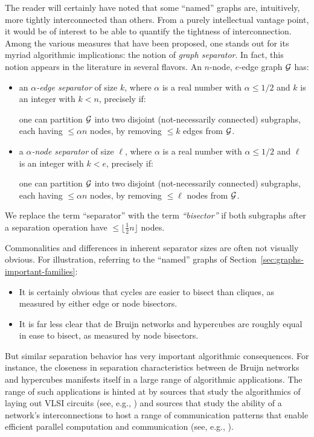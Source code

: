 The reader will certainly have noted that some ``named'' graphs are,
intuitively, more tightly interconnected than others.  From a purely
intellectual vantage point, it would be of interest to be able to
quantify the tightness of interconnection.  Among the various measures
that have been proposed, one stands out for its myriad algorithmic
implications: the notion of {\it graph separator}.  In fact, this
notion appears in the literature in several flavors.  An $n$-node,
$e$-edge graph $\mbox{$\cal G$}$ has:
\begin{itemize}
\item
an {\it $\alpha$-edge separator} of size $k$, 
 where $\alpha$ is a
real number with $\alpha \leq 1/2$ and $k$ is an integer with $k < n$,
precisely if:

\smallskip

one can partition $\mbox{$\cal G$}$ into two disjoint (not-necessarily connected)
subgraphs, each having $\leq \alpha n$ nodes, by removing $\leq k$
edges from $\mbox{$\cal G$}$.

\item
a {\it $\alpha$-node separator} of size $\ell$,
where $\alpha$ is a real number with $\alpha \leq 1/2$ and $\ell$ is
an integer with $k < e$, precisely if:

\smallskip

one can partition $\mbox{$\cal G$}$ into two disjoint (not-necessarily connected)
subgraphs, each having $\leq \alpha n$ nodes, by removing $\leq \ell$
nodes from $\mbox{$\cal G$}$.
\end{itemize}
We replace the term ``separator'' with the term {\em ``bisector''} 
 
if both subgraphs after a separation operation have $\leq \lfloor
\frac{1}{2} n \rfloor$ nodes.

\medskip

Commonalities and differences in inherent separator sizes are often
not visually obvious.  For illustration, referring to the ``named''
graphs of Section~\ref{sec:graphs-important-families}:
\begin{itemize}
\item
It is certainly obvious that cycles are easier to bisect than cliques,
as measured by either edge or node bisectors.
\item
It is far less clear that de Bruijn networks and hypercubes are
roughly equal in ease to bisect, as measured by node bisectors.
\end{itemize}
But similar separation behavior has very important algorithmic
consequences.  For instance, the closeness in separation
characteristics between de Bruijn networks and hypercubes manifests
itself in a large range of algorithmic applications.  The range of
such applications is hinted at by sources that study the algorithmics
of laying out VLSI circuits (see, e.g., \cite{Leiserson85}) and
sources that study the ability of a network's interconnections to host
a range of communication patterns that enable efficient parallel
computation and communication (see, e.g.,
\cite{AnnexsteinBR90,Leiserson85,Ullman84}).


